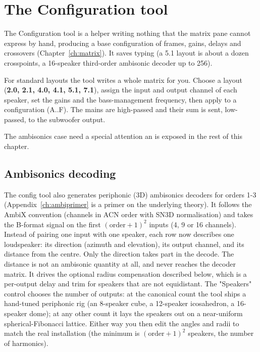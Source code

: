 \chapter{The Configuration tool}\label{ch:config}

The Configuration tool is a helper writing nothing that the matrix pane cannot express by hand, producing a base configuration of frames, gains, delays and crossovers (Chapter~\ref{ch:matrix}). It saves typing (a 5.1 layout is about a dozen crosspoints, a 16-speaker third-order ambisonic decoder up to 256).

For standard layouts the tool writes a whole matrix for you. Choose a layout (\textbf{2.0, 2.1, 4.0, 4.1, 5.1, 7.1}), assign the input and output channel of each speaker, set the gains and the bass-management  frequency, then apply to a configuration (A..F). The mains are high-passed and their sum is sent, low-passed, to the subwoofer output.

The ambisonics case need a special attention an is exposed in the rest of this chapter.

\section{Ambisonics decoding}\label{sec:ambisonics}
The config tool also generates periphonic (3D) ambisonics decoders for orders 1-3 (Appendix~\ref{ch:ambiprimer} is a primer on the underlying theory). It follows the AmbiX convention (channels in ACN order with SN3D normalisation) and takes the B-format signal on the first $(\mathrm{order}+1)^2$ inputs (4, 9 or 16 channels). Instead of pairing one input with one speaker, each row now describes one loudspeaker: its direction (azimuth and elevation), its output channel, and its distance from the centre. Only the direction takes part in the decode. The distance is not an ambisonic quantity at all, and never reaches the decoder matrix. It drives the optional radius compensation described below, which is a per-output delay and trim for speakers that are not equidistant. The "Speakers" control chooses the number of outputs: at the canonical count the tool ships a hand-tuned periphonic rig (an 8-speaker cube, a 12-speaker icosahedron, a 16-speaker dome); at any other count it lays the speakers out on a near-uniform spherical-Fibonacci lattice. Either way you then edit the angles and radii to match the real installation (the minimum is $(\mathrm{order}+1)^2$ speakers, the number of harmonics).

